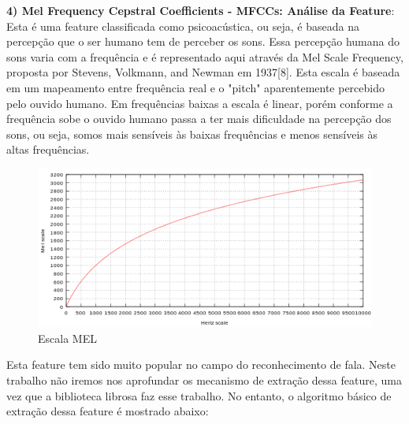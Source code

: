 \documentclass[11pt]{article}
\makeatletter
\def\maxwidth{\ifdim\Gin@nat@width>\linewidth\linewidth
    \else\Gin@nat@width\fi}
\let\Oldincludegraphics\includegraphics
\renewcommand{\includegraphics}[1]{\Oldincludegraphics[width=.8\maxwidth]{#1}}
\makeatother
\begin{document}
    \textbf{4) Mel Frequency Cepstral Coefficients - MFCCs: Análise da
Feature}: Esta é uma feature classificada como psicoacústica, ou seja, é
baseada na percepção que o ser humano tem de perceber os sons. Essa
percepção humana do sons varia com a frequência e é representado aqui
através da Mel Scale Frequency, proposta por Stevens, Volkmann, and
Newman em 1937{[}8{]}. Esta escala é baseada em um mapeamento entre
frequência real e o "pitch" aparentemente percebido pelo ouvido humano.
Em frequências baixas a escala é linear, porém conforme a frequência
sobe o ouvido humano passa a ter mais dificuldade na percepção dos sons,
ou seja, somos mais sensíveis às baixas frequências e menos sensíveis às
altas frequências.

\begin{figure}[htbp]
\centering
\includegraphics{Mel-Hz_plot.svg.png}
\caption{Escala MEL}
\end{figure}

Esta feature tem sido muito popular no campo do reconhecimento de fala.
Neste trabalho não iremos nos aprofundar os mecanismo de extração dessa
feature, uma vez que a biblioteca librosa faz esse trabalho. No entanto,
o algoritmo básico de extração dessa feature é mostrado abaixo:
\end{document}
